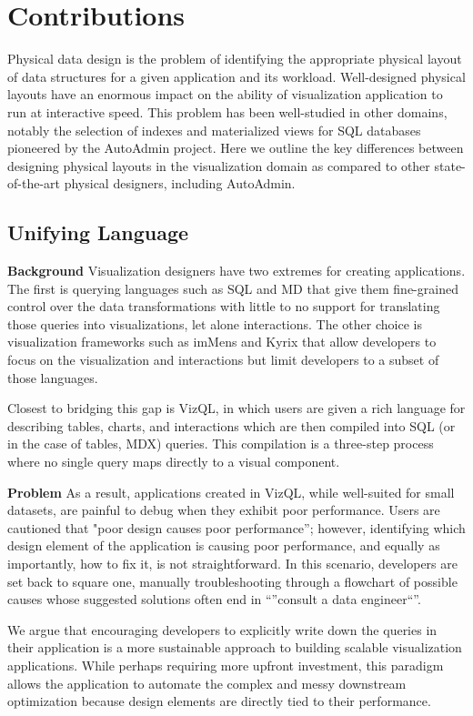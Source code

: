 \section{Contributions}
Physical data design is the problem of identifying the appropriate physical layout of data structures for a given application and its workload.  Well-designed physical layouts have an enormous impact on the ability of visualization application to run at interactive speed. This problem has been well-studied in other domains, notably the selection of indexes and materialized views for SQL databases pioneered by the AutoAdmin project. Here we outline the key differences between designing physical layouts in the visualization domain as compared to other state-of-the-art physical designers, including AutoAdmin. 

\subsection{Unifying Language} 
\textbf{Background} Visualization designers have two extremes for creating applications. The first is querying languages such as SQL and MD that give them fine-grained control over the data transformations with little to no support for translating those queries into visualizations, let alone interactions. The other choice is visualization frameworks such as imMens and Kyrix that allow developers to focus on the visualization and interactions but limit developers to a subset of those languages.

Closest to bridging this gap is VizQL, in which users are given a rich language for describing tables, charts, and interactions which are then compiled into SQL (or in the case of tables, MDX) queries.  This compilation is a three-step process where no single query maps directly to a visual component.

\textbf{Problem} As a result, applications created in VizQL, while well-suited for small datasets, are painful to debug when they exhibit poor performance. Users are cautioned that "poor design causes poor performance''; however, identifying which design element of the application is causing poor performance, and equally as importantly, how to fix it, is not straightforward. In this scenario, developers are set back to square one, manually troubleshooting through a flowchart of possible causes whose suggested solutions often end in ``''consult a data engineer``''. 

We argue that encouraging developers to explicitly write down the queries in their application is a more sustainable approach to building scalable visualization applications. While perhaps requiring more upfront investment, this paradigm allows the application to automate the complex and messy downstream optimization because design elements are directly tied to their performance. 

